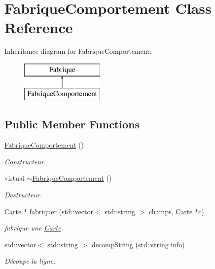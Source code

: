 \hypertarget{class_fabrique_comportement}{\section{Fabrique\-Comportement Class Reference}
\label{class_fabrique_comportement}
}
Inheritance diagram for Fabrique\-Comportement\-:\begin{figure}[H]
\begin{center}
\leavevmode
\includegraphics[height=2.000000cm]{class_fabrique_comportement}
\end{center}
\end{figure}
\subsection*{Public Member Functions}
\begin{DoxyCompactItemize}
\item 
\hyperlink{class_fabrique_comportement_a6dbfe3f5ed715a11f74b311625a94cfd}{Fabrique\-Comportement} ()
\begin{DoxyCompactList}\small\item\em Constructeur. \end{DoxyCompactList}\item 
virtual \hyperlink{class_fabrique_comportement_a73b72a29312ca0f16d750bb6ed45f29c}{$\sim$\-Fabrique\-Comportement} ()
\begin{DoxyCompactList}\small\item\em Destructeur. \end{DoxyCompactList}\item 
\hyperlink{class_carte}{Carte} $\ast$ \hyperlink{class_fabrique_comportement_a9fcb07ef95aacd3677bba993fafa084e}{fabriquer} (std\-::vector$<$ std\-::string $>$ champs, \hyperlink{class_carte}{Carte} $\ast$c)
\begin{DoxyCompactList}\small\item\em fabrique une \hyperlink{class_carte}{Carte}. \end{DoxyCompactList}\item 
std\-::vector$<$ std\-::string $>$ \hyperlink{class_fabrique_comportement_a166b586a89e0f86a57202eee119a3dcc}{decomp\-String} (std\-::string info)
\begin{DoxyCompactList}\small\item\em Découpe la ligne. \end{DoxyCompactList}\end{DoxyCompactItemize}


